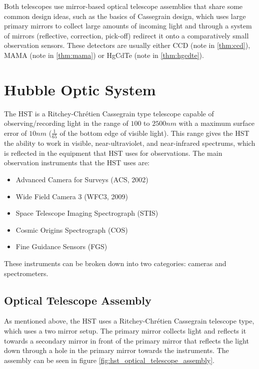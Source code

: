 Both telescopes use mirror-based optical telescope assemblies that share some common design ideas, such as the basics of Cassegrain design, which uses large primary mirrors to collect large amounts of incoming light and through a system of mirrors (reflective, correction, pick-off) redirect it onto a comparatively small observation sensors. These detectors are usually either CCD (note in \ref{thm:ccd}), MAMA (note in \ref{thm:mama}) or HgCdTe (note in \ref{thm:hgcdte}). 

\clearpage
\section{Hubble Optic System}

The HST is a Ritchey-Chrétien Cassegrain type telescope capable of observing/recording light in the range of $100$ to $2500nm$ with a maximum surface error of $10nm$ ($\frac{1}{65}$ of the bottom edge of visible light). This range gives the HST the ability to work in visible, near-ultraviolet, and near-infrared spectrums, which is reflected in the equipment that HST uses for observations. The main observation instruments that the HST uses are:

\begin{itemize}
    \item Advanced Camera for Surveys (ACS, 2002)
    \item Wide Field Camera 3 (WFC3, 2009)
    \item Space Telescope Imaging Spectrograph (STIS)
    \item Cosmic Origins Spectrograph (COS)
    \item Fine Guidance Sensors (FGS)
\end{itemize}

These instruments can be broken down into two categories: cameras and spectrometers.

\subsection{Optical Telescope Assembly}
\label{subsec:hst_ota}

As mentioned above, the HST uses a Ritchey-Chrétien Cassegrain telescope type, which uses a two mirror setup. The primary mirror collects light and reflects it towards a secondary mirror in front of the primary mirror that reflects the light down through a hole in the primary mirror towards the instruments. The assembly can be seen in figure \ref{fig:hst_optical_telescope_assembly}.

